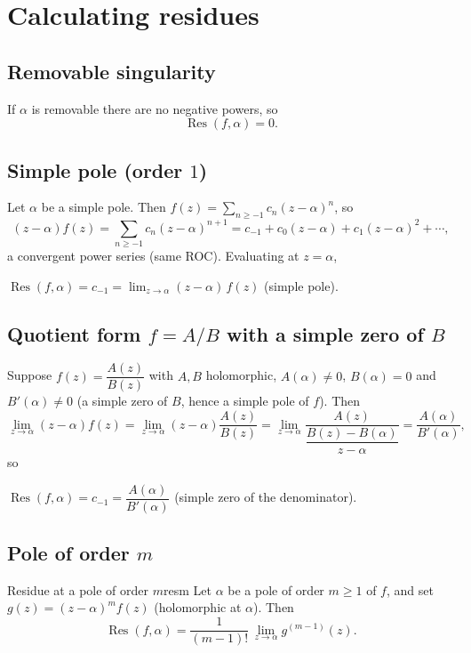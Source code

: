 \documentclass[11pt,openany]{report}
\newcommand{\Res}{\operatorname{Res}}
\begin{document}
\section{Calculating residues}

\subsection{Removable singularity}
If $\alpha$ is removable there are no negative powers, so
\[
  \Res(f,\alpha) = 0 .
\]

\subsection{Simple pole (order $1$)}
Let $\alpha$ be a simple pole. Then $f(z)=\sum_{n\ge-1} c_n(z-\alpha)^n$, so
\[
  (z-\alpha)f(z) = \sum_{n\ge-1} c_n(z-\alpha)^{n+1} = c_{-1} + c_0(z-\alpha) + c_1(z-\alpha)^2 + \cdots,
\]
a convergent power series (same ROC). Evaluating at $z=\alpha$,
\begin{keybox}
\centering
$\Res(f,\alpha) = c_{-1} = \displaystyle\lim_{z\to\alpha}(z-\alpha)\,f(z)$
\qquad (simple pole).
\end{keybox}

\subsection{Quotient form $f=A/B$ with a simple zero of $B$}
Suppose $f(z)=\dfrac{A(z)}{B(z)}$ with $A,B$ holomorphic, $A(\alpha)\ne0$, $B(\alpha)=0$
and $B'(\alpha)\ne0$ (a simple zero of $B$, hence a simple pole of $f$). Then
\[
  \lim_{z\to\alpha}(z-\alpha)f(z)
  = \lim_{z\to\alpha}(z-\alpha)\frac{A(z)}{B(z)}
  = \lim_{z\to\alpha}\frac{A(z)}{\dfrac{B(z)-B(\alpha)}{z-\alpha}}
  = \frac{A(\alpha)}{B'(\alpha)} ,
\]
so
\begin{keybox}
\centering
$\Res(f,\alpha) = c_{-1} = \dfrac{A(\alpha)}{B'(\alpha)}$
\qquad (simple zero of the denominator).
\end{keybox}

\subsection{Pole of order $m$}
\begin{theorem}{Residue at a pole of order $m$}{resm}
Let $\alpha$ be a pole of order $m\ge1$ of $f$, and set $g(z)=(z-\alpha)^m f(z)$
(holomorphic at $\alpha$). Then
\[
  \boxed{\ \Res(f,\alpha) = \frac{1}{(m-1)!}\,\lim_{z\to\alpha} g^{(m-1)}(z).\ }
\]
\end{theorem}
\end{document}
